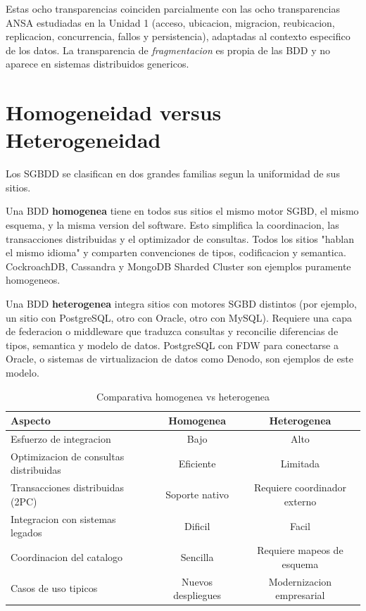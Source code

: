 \documentclass[11pt,a4paper]{article}
\begin{document}
Estas ocho transparencias coinciden parcialmente con las ocho transparencias ANSA estudiadas en la Unidad 1 (acceso, ubicacion, migracion, reubicacion, replicacion, concurrencia, fallos y persistencia), adaptadas al contexto especifico de los datos. La transparencia de \textit{fragmentacion} es propia de las BDD y no aparece en sistemas distribuidos genericos.

\section{Homogeneidad versus Heterogeneidad}

Los SGBDD se clasifican en dos grandes familias segun la uniformidad de sus sitios.

Una BDD \textbf{homogenea} tiene en todos sus sitios el mismo motor SGBD, el mismo esquema, y la misma version del software. Esto simplifica la coordinacion, las transacciones distribuidas y el optimizador de consultas. Todos los sitios "hablan el mismo idioma" y comparten convenciones de tipos, codificacion y semantica. CockroachDB, Cassandra y MongoDB Sharded Cluster son ejemplos puramente homogeneos.

Una BDD \textbf{heterogenea} integra sitios con motores SGBD distintos (por ejemplo, un sitio con PostgreSQL, otro con Oracle, otro con MySQL). Requiere una capa de federacion o middleware que traduzca consultas y reconcilie diferencias de tipos, semantica y modelo de datos. PostgreSQL con FDW para conectarse a Oracle, o sistemas de virtualizacion de datos como Denodo, son ejemplos de este modelo.

\begin{table}[H]
\centering
\caption{Comparativa homogenea vs heterogenea}
\small
\begin{tabular}{lcc}
\toprule
\textbf{Aspecto} & \textbf{Homogenea} & \textbf{Heterogenea} \\
\midrule
Esfuerzo de integracion & Bajo & Alto \\
Optimizacion de consultas distribuidas & Eficiente & Limitada \\
Transacciones distribuidas (2PC) & Soporte nativo & Requiere coordinador externo \\
Integracion con sistemas legados & Dificil & Facil \\
Coordinacion del catalogo & Sencilla & Requiere mapeos de esquema \\
Casos de uso tipicos & Nuevos despliegues & Modernizacion empresarial \\
\bottomrule
\end{tabular}
\label{tab:homohetero}
\end{table}
\end{document}
